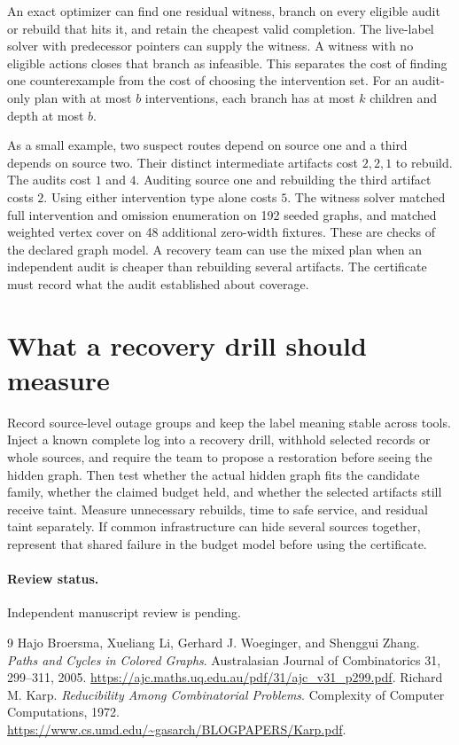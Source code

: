 \documentclass[11pt]{article}
\begin{document}
An exact optimizer can find one residual witness, branch on every
eligible audit or rebuild that hits it, and retain the cheapest
valid completion. The live-label solver with predecessor pointers
can supply the witness. A witness with no eligible actions closes
that branch as infeasible. This separates the cost of finding one
counterexample from the cost of choosing the intervention set.
For an audit-only plan with at most $b$ interventions, each branch
has at most $k$ children and depth at most $b$.

As a small example, two suspect routes depend on source one and
a third depends on source two. Their distinct intermediate
artifacts cost $2,2,1$ to rebuild. The audits cost $1$ and $4$.
Auditing source one and rebuilding the third artifact costs $2$.
Using either intervention type alone costs $5$. The witness
solver matched full intervention and omission enumeration on 192
seeded graphs, and matched weighted vertex cover on 48 additional
zero-width fixtures. These are checks of the declared graph model.
A recovery team can use the mixed plan when an independent audit
is cheaper than rebuilding several artifacts. The certificate must
record what the audit established about coverage.

\newpage
\section{What a recovery drill should measure}
Record source-level outage groups and keep the label meaning
stable across tools. Inject a known complete log into a recovery
drill, withhold selected records or whole sources, and require
the team to propose a restoration before seeing the hidden
graph. Then test whether the actual hidden graph fits the
candidate family, whether the claimed budget held, and whether
the selected artifacts still receive taint. Measure unnecessary
rebuilds, time to safe service, and residual taint separately.
If common infrastructure can hide several sources together,
represent that shared failure in the budget model before using
the certificate.

\paragraph{Review status.} Independent manuscript review is pending.

\begin{thebibliography}{9}
 Hajo Broersma, Xueliang Li, Gerhard J.
Woeginger, and Shenggui Zhang.
\emph{Paths and Cycles in Colored Graphs}.
Australasian Journal of Combinatorics 31, 299--311, 2005.
\url{https://ajc.maths.uq.edu.au/pdf/31/ajc_v31_p299.pdf}.
 Richard M. Karp.
\emph{Reducibility Among Combinatorial Problems}.
Complexity of Computer Computations, 1972.
\url{https://www.cs.umd.edu/~gasarch/BLOGPAPERS/Karp.pdf}.
\end{thebibliography}
\end{document}

